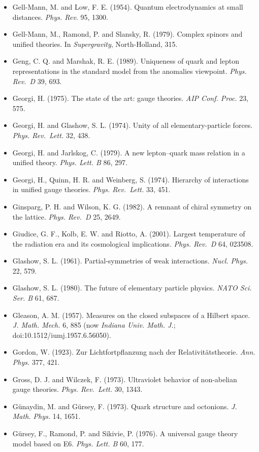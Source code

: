 \documentclass[
  11pt,
]{article}
\begin{document}
\begin{itemize}
\item
  Gell-Mann, M. and Low, F. E. (1954). Quantum electrodynamics at small distances. \emph{Phys. Rev.} 95, 1300.
\item
  Gell-Mann, M., Ramond, P. and Slansky, R. (1979). Complex spinors and unified theories. In \emph{Supergravity}, North-Holland, 315.
\item
  Geng, C. Q. and Marshak, R. E. (1989). Uniqueness of quark and lepton representations in the standard model from the anomalies viewpoint. \emph{Phys. Rev.~D} 39, 693.
\item
  Georgi, H. (1975). The state of the art: gauge theories. \emph{AIP Conf. Proc.} 23, 575.
\item
  Georgi, H. and Glashow, S. L. (1974). Unity of all elementary-particle forces. \emph{Phys. Rev.~Lett.} 32, 438.
\item
  Georgi, H. and Jarlskog, C. (1979). A new lepton--quark mass relation in a unified theory. \emph{Phys. Lett. B} 86, 297.
\item
  Georgi, H., Quinn, H. R. and Weinberg, S. (1974). Hierarchy of interactions in unified gauge theories. \emph{Phys. Rev.~Lett.} 33, 451.
\item
  Ginsparg, P. H. and Wilson, K. G. (1982). A remnant of chiral symmetry on the lattice. \emph{Phys. Rev.~D} 25, 2649.
\item
  Giudice, G. F., Kolb, E. W. and Riotto, A. (2001). Largest temperature of the radiation era and its cosmological implications. \emph{Phys. Rev.~D} 64, 023508.
\item
  Glashow, S. L. (1961). Partial-symmetries of weak interactions. \emph{Nucl. Phys.} 22, 579.
\item
  Glashow, S. L. (1980). The future of elementary particle physics. \emph{NATO Sci. Ser. B} 61, 687.
\item
  Gleason, A. M. (1957). Measures on the closed subspaces of a Hilbert space. \emph{J. Math. Mech.} 6, 885 (now \emph{Indiana Univ. Math. J.}; doi:10.1512/iumj.1957.6.56050).
\item
  Gordon, W. (1923). Zur Lichtfortpflanzung nach der Relativitätstheorie. \emph{Ann. Phys.} 377, 421.
\item
  Gross, D. J. and Wilczek, F. (1973). Ultraviolet behavior of non-abelian gauge theories. \emph{Phys. Rev.~Lett.} 30, 1343.
\item
  Günaydin, M. and Gürsey, F. (1973). Quark structure and octonions. \emph{J. Math. Phys.} 14, 1651.
\item
  Gürsey, F., Ramond, P. and Sikivie, P. (1976). A universal gauge theory model based on E6. \emph{Phys. Lett. B} 60, 177.

\end{itemize}
\end{document}
